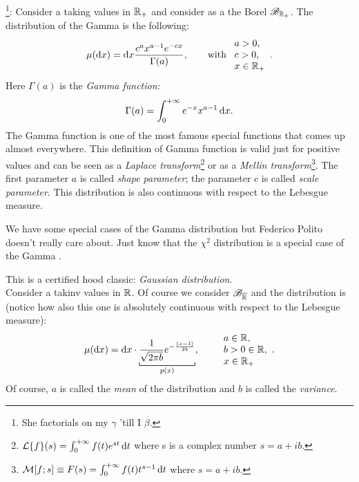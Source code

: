 \documentclass{report}
\begin{document}
\begin{example}
	\footnote{She factorials on my $\gamma$ 'till I $\beta$.}:
	Consider a \rv{} taking values in $\mathbb{R}_+$ and consider as a \sa{} the Borel \sa{} $\mathscr{B}_{\mathbb{R}_+}$. The distribution of the Gamma \rv{} is the following:
	\[\mu(\mathop{}\!\mathrm{d} x)=\mathop{}\!\mathrm{d} x\frac{c^ax^{a-1}e^{-cx}}{\Gamma(a)},\qquad
	\text{with }
	\begin{array}{l}
		a>0,\\
		c>0,\\
		x\in\mathbb{R}_+
	\end{array}.\]
	Here $\Gamma(a)$ is the \textit{Gamma function:}
	\[
	\Gamma(a)=\int_{0}^{+\infty}e^{-x}x^{a-1}\mathop{}\!\mathrm{d} x.
	\]
	The Gamma function is one of the most famous special functions that comes up almost everywhere. This definition of Gamma function is valid just for positive values and can be seen as a \textit{Laplace transform}\footnote{$\mathcal{L}\{f\}(s)=\int_{0}^{+\infty}f(t)e^{st}\mathop{}\!\mathrm{d} t$ where s is a complex number $s=a+ib$.} or as a \textit{Mellin transform}\footnote{$\mathcal{M}[f;s]\equiv F(s)=\int_{0}^{+\infty}f(t)t^{s-1}\mathop{}\!\mathrm{d} t$ where $s=a+ib$.}.
	The first parameter $a$ is called \textit{shape parameter}; the parameter $c$ is called \textit{scale parameter}. This distribution is also continuous with respect to the Lebesgue measure. \par
	We have some special cases of the Gamma distribution but Federico Polito doesn't really care about. Just know that the $\chi^2$ distribution is a special case of the Gamma \rv{}.
\end{example}
\begin{example}
	This is a certified hood classic: \emph{Gaussian distribution}.\\
	Consider a \rv{} takinv values in $\mathbb{R}$. Of course we consider $\mathscr{B}_{\overline{\mathbb{R}}}$ and the distribution is (notice how also this one is absolutely continuous with respect to the Lebesgue measure):
	\[\mu(\dx)=\dx\cdot\underbracket[0.6pt]{\frac{1}{\sqrt{2\pi b}}e^{-\frac{(x-1)}{2b}}}_{\mathclap{p(x)}},\qquad \begin{array}{l}
	a\in\R,\\
	b>0\in\R,\\
	x\in\R_+
	\end{array}.\]
	Of course, $a$ is called the \textit{mean} of the distribution and $b$ is called the \textit{variance}.
\end{example}
\end{document}
